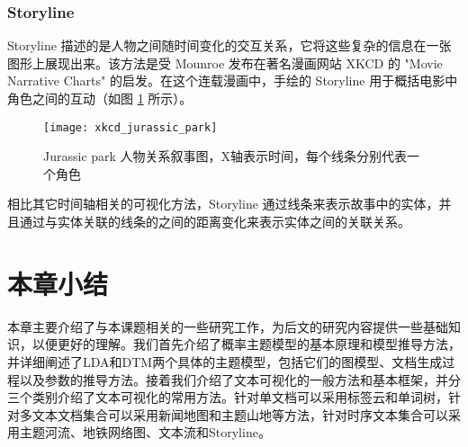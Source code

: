 \subsubsection{Storyline}
Storyline 描述的是人物之间随时间变化的交互关系，它将这些复杂的信息在一张图形上展现出来。该方法是受 Mounroe 发布在著名漫画网站 XKCD 的 "Movie Narrative Charts" \cite{xkcd657} 的启发。在这个连载漫画中，手绘的 Storyline 用于概括电影中角色之间的互动（如图 \ref{xkcd} 所示）。
\begin{figure}[htb]
    \centering
    \texttt{[image: xkcd\_jurassic\_park]}
    \caption{Jurassic park 人物关系叙事图，X轴表示时间，每个线条分别代表一个角色}
    \label{xkcd}
\end{figure}
相比其它时间轴相关的可视化方法，Storyline 通过线条来表示故事中的实体，并且通过与实体关联的线条的之间的距离变化来表示实体之间的关联关系。

\section{本章小结}
本章主要介绍了与本课题相关的一些研究工作，为后文的研究内容提供一些基础知识，以便更好的理解。我们首先介绍了概率主题模型的基本原理和模型推导方法，并详细阐述了LDA\cite{Blei:2003}和DTM\cite{Blei:2006}两个具体的主题模型，包括它们的图模型、文档生成过程以及参数的推导方法。接着我们介绍了文本可视化的一般方法和基本框架，并分三个类别介绍了文本可视化的常用方法。针对单文档可以采用标签云和单词树，针对多文本文档集合可以采用新闻地图和主题山地等方法，针对时序文本集合可以采用主题河流、地铁网络图、文本流和Storyline。



